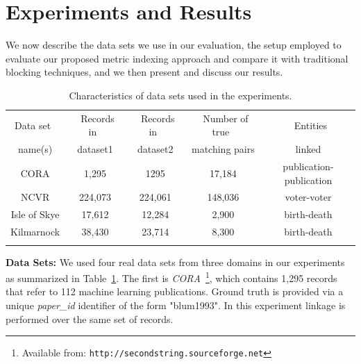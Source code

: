 \documentclass{llncs}
\begin{document}

\section{Experiments and Results}
\label{sec-exp}

We now describe the data sets we use in our evaluation, the setup
employed to evaluate our proposed metric indexing approach and
compare it with traditional blocking techniques, and we then present
and discuss our results.



\begin{table}[t]
\caption{Characteristics of data sets used in the experiments.}
 \label{table-datasets}
  \centering
  \begin{scriptsize}
  \begin{tabular}{ccccc}
  \hline\noalign{\smallskip}
  Data set~ & ~Records in~& ~Records in~ & ~Number of true~& ~Entities\\
  name(s)  & dataset1  & dataset2  & matching pairs & linked \\
  \noalign{\smallskip} \hline \noalign{\smallskip}
  CORA  & 1,295 & 1295 & 17,184 & publication-publication\\
  NCVR  & ~224,073~ & 224,061 & ~148,036~ & voter-voter\\
  Isle of Skye & 17,612 & 12,284& 2,900 & birth-death\\
  Kilmarnock  & 38,430 & 23,714 & 8,300 & birth-death\\
  \noalign{\smallskip} \hline
  \end{tabular}
  \end{scriptsize}
\end{table}

\smallskip
\textbf{Data Sets:}
We used four real data sets from three domains in our experiments as
summarized in Table~\ref{table-datasets}. The first is
\emph{CORA}~\footnote{Available from:
\texttt{http://secondstring.sourceforge.net}}, which contains 1,295
records that refer to 112 machine learning publications. Ground truth is provided via a unique
\emph{paper\_id} identifier of the form "blum1993". In this experiment linkage is performed over the same set of records.
\end{document}
